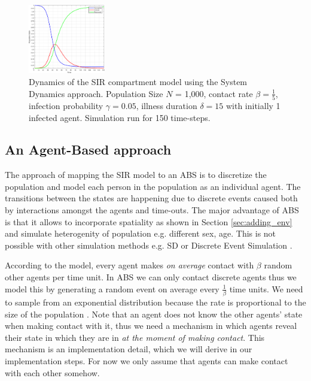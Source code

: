 \begin{figure}
	\centering
	\includegraphics[width=0.3\textwidth, angle=0]{./fig/SD/SIR_SD_1000agents_150t_001dt.png}
	\caption{Dynamics of the SIR compartment model using the System Dynamics approach. Population Size $N$ = 1,000, contact rate $\beta =  \frac{1}{5}$, infection probability $\gamma = 0.05$, illness duration $\delta = 15$ with initially 1 infected agent. Simulation run for 150 time-steps.}
	\label{fig:sir_sd_dynamics}
\end{figure}

\subsection*{An Agent-Based approach}
The approach of mapping the SIR model to an ABS is to discretize the population and model each person in the population as an individual agent. The transitions between the states are happening due to discrete events caused both by interactions amongst the agents and time-outs. The major advantage of ABS is that it allows to incorporate spatiality as shown in Section \ref{sec:adding_env} and simulate heterogenity of population e.g. different sex, age. This is not possible with other simulation methods e.g. SD or Discrete Event Simulation \cite{zeigler_theory_2000}.

According to the model, every agent makes \textit{on average} contact with $\beta$ random other agents per time unit. In ABS we can only contact discrete agents thus we model this by generating a random event on average every $\frac{1}{\beta}$ time units. We need to sample from an exponential distribution because the rate is proportional to the size of the population \cite{borshchev_system_2004}. Note that an agent does not know the other agents' state when making contact with it, thus we need a mechanism in which agents reveal their state in which they are in \textit{at the moment of making contact}. This mechanism is an implementation detail, which we will derive in our implementation steps. For now we only assume that agents can make contact with each other somehow.